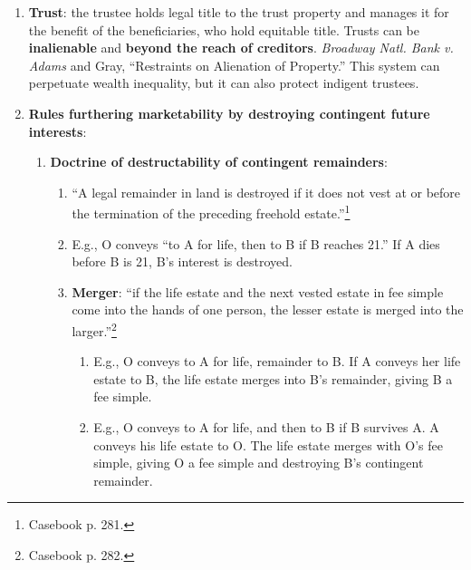 \begin{enumerate}
\begin{enumerate}
        \item \textbf{Executory interest vs. remainder}: ``The difference 
        between taking possession as soon as the prior estate ends and 
        divesting the prior estate is the essential difference between a 
        remainder and an executory interest.''\footnote{Casebook p. 259.}
    \end{enumerate}
    \item \textbf{Trust}: the trustee holds legal title to the trust property 
    and manages it for the benefit of the beneficiaries, who hold equitable 
    title. Trusts can be \textbf{inalienable} and \textbf{beyond the reach of 
    creditors}. \emph{Broadway Natl. Bank v. Adams} and Gray, ``Restraints on 
    Alienation of Property.'' This system can perpetuate wealth inequality, 
    but it can also protect indigent trustees.
    \item \textbf{Rules furthering marketability by destroying contingent 
    future interests}:
    \begin{enumerate}
        \item \textbf{Doctrine of destructability of contingent remainders}:
        \begin{enumerate}
            \item ``A legal remainder in land is destroyed if it does not vest 
            at or before the termination of the preceding freehold 
            estate.''\footnote{Casebook p. 281.}
            \item E.g., O conveys ``to A for life, then to B if B reaches 
            21.'' If A dies before B is 21, B's interest is destroyed.
            \item \textbf{Merger}: ``if the life estate and the next vested 
            estate in fee simple come into the hands of one person, the lesser 
            estate is merged into the larger.''\footnote{Casebook p. 282.}
            \begin{enumerate}
                \item E.g., O conveys to A for life, remainder to B. If A 
                conveys her life estate to B, the life estate merges into B's 
                remainder, giving B a fee simple.
                \item E.g., O conveys to A for life, and then to B if B 
                survives A.  A conveys his life estate to O. The life estate 
                merges with O's fee simple, giving O a fee simple and 
                destroying B's contingent remainder.
            \end{enumerate}

\end{enumerate}
\end{enumerate}
\end{enumerate}
